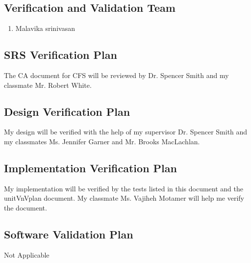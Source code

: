 \documentclass[12pt, titlepage]{article}
\newcommand{\famname}{CFS} %
\begin{document}
\subsection{Verification and Validation Team}

\begin{enumerate}
	\item Malavika srinivasan
\end{enumerate}


\subsection{SRS Verification Plan}

The CA document for \famname{} will be reviewed by Dr. Spencer Smith
and my classmate Mr. Robert White.

\subsection{Design Verification Plan}

My design will be verified with the help of my supervisor Dr. Spencer Smith and
my classmates Ms. Jennifer Garner and Mr. Brooks MacLachlan. 

\subsection{Implementation Verification Plan}

My implementation will be verified by the tests listed in this document and the
unitVnVplan document. My classmate Ms. Vajiheh Motamer will help me verify the document.	

\subsection{Software Validation Plan}

Not Applicable 
\end{document}
